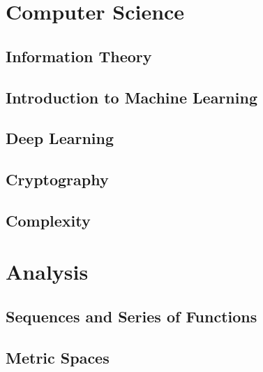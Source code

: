 \documentclass[oneside,openany]{book}
\theoremstyle{definition}
\begin{document}
\part{Computer Science}

\chapter{Information Theory}


\chapter{Introduction to Machine Learning}


\chapter{Deep Learning}


\chapter{Cryptography}


\chapter{Complexity}



\part{Analysis}

\chapter{Sequences and Series of Functions}


\chapter{Metric Spaces}

\end{document}
